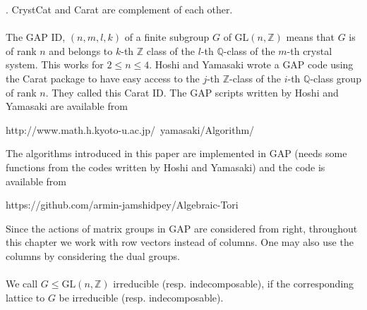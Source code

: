 \documentclass[a4paper, 14pt]{extarticle}
\theoremstyle{plain}
\theoremstyle{definition}
\newcommand{\Z}{\ensuremath{\mathbb{Z}}}
\newcommand{\Q}{\ensuremath{\mathbb{Q}}}
\newcommand{\G}{G}
\begin{document}
\cite{Crystallography}. CrystCat and Carat are complement of each other. \\
\\
The GAP ID, $(n,m,l,k)$ of a finite subgroup $G$ of $\mathrm{GL}(n,\Z)$ means that 
$G$ is of rank $n$ and belongs to $k$-th $\Z$ class of the $l$-th $\Q$-class of the 
$m$-th crystal system. This works for $2\leq n \leq 4$. Hoshi and Yamasaki wrote 
a GAP code using the Carat package to have easy access to the $j$-th $\Z$-class 
of the $i$-th $\Q$-class group of rank $n$. They called this Carat ID. The GAP 
scripts written by Hoshi and Yamasaki are available from
\begin{center}
http://www.math.h.kyoto-u.ac.jp/~yamasaki/Algorithm/
\end{center}
The algorithms introduced in this paper are implemented in GAP (needs some 
functions from the codes written by Hoshi and Yamasaki) and the code is available from
\begin{center}
https://github.com/armin-jamshidpey/Algebraic-Tori
\end{center}
Since the actions of matrix groups in GAP are considered from right, throughout 
this chapter we work with row vectors instead of columns. One may also use the 
columns by considering the dual groups.\\
\\
We call $\G \leq \mathrm{GL}(n,\Z)$ irreducible (resp. indecomposable), if the corresponding 
lattice to $G$ be irreducible (resp. indecomposable).
\end{document}

